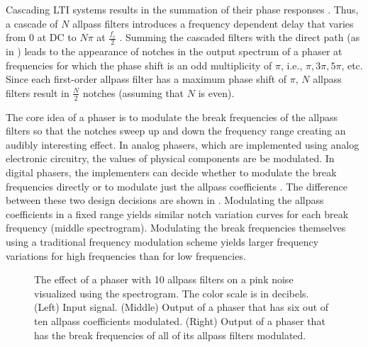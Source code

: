 Cascading \ac{LTI} systems results in the summation of their phase responses \cite{Oppenheim1997}. Thus, a cascade of $N$ allpass filters introduces a frequency dependent delay that varies from 0 at DC to $N\pi$ at $\frac{f_c}{2}$ \cite{PASPWEB2010}. Summing the cascaded filters with the direct path (as in ) leads to the appearance of notches in the output spectrum of a phaser at frequencies for which the phase shift is an odd multiplicity of $\pi$, i.e., $\pi, 3\pi, 5\pi$, etc. Since each first-order allpass filter has a maximum phase shift of $\pi$, $N$ allpass filters result in $\frac{N}{2}$ notches (assuming that $N$ is even).

The core idea of a phaser is to modulate the break frequencies of the allpass filters so that the notches sweep up and down the frequency range creating an audibly interesting effect. In analog phasers, which are implemented using analog electronic circuitry, the values of physical components are be modulated. In digital phasers, the implementers can decide whether to modulate the break frequencies directly or to modulate just the allpass coefficients \cite{Kiiski2016}. The difference between these two design decisions are shown in . Modulating the allpass coefficients in a fixed range yields similar notch variation curves for each break frequency (middle spectrogram). Modulating the break frequencies themselves using a traditional frequency modulation scheme yields larger frequency variations for high frequencies than for low frequencies.

\newcommand{\scaleboxsize}{0.65}
\newcommand{\subfigurewidththree}{0.3\textwidth}
\begin{figure}
    \begin{subfigure}{0.33\textwidth}
        \centering
        \scalebox{\scaleboxsize}{}
    \end{subfigure}
    \begin{subfigure}{0.28\textwidth}
        \centering
        \scalebox{\scaleboxsize}{}
    \end{subfigure}
    \begin{subfigure}{0.34\textwidth}
        \centering
        \scalebox{0.66}{}
    \end{subfigure}
    \caption{The effect of a phaser with 10 allpass filters on a pink noise visualized using the spectrogram. The color scale is in decibels. (Left) Input signal. (Middle) Output of a phaser that has six out of ten allpass coefficients modulated. (Right) Output of a phaser that has the break frequencies of all of its allpass filters modulated.}
    \label{fig:pink_noise_phasered}
\end{figure}

